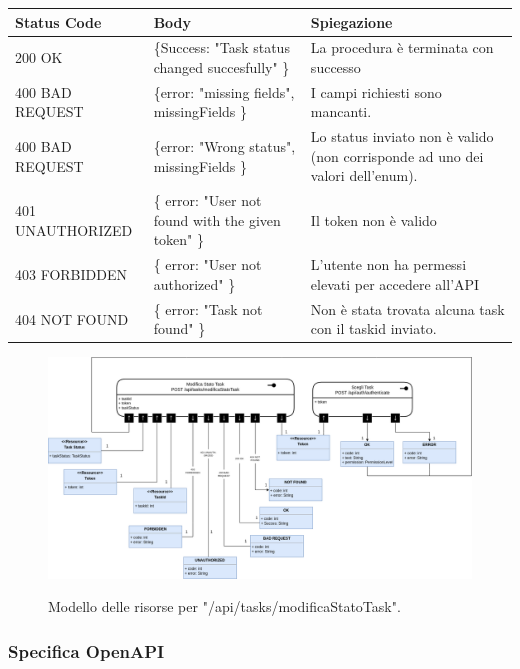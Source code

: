 \documentclass{report}
\begin{document}
\begin{center} %
	\centering
	\begin{tabular}{ |p{4cm}|p{4cm}|p{4cm}| }
		\hline
		\centering Status Code & \qquad\qquad\quad Body & \qquad\quad Spiegazione\\ %
		\hline
		200 OK & \{Success: "Task status changed succesfully" \}  & La procedura è terminata con successo	\\ 
		\hline
		400 BAD REQUEST & \{error: "missing fields", missingFields \} & I campi richiesti sono mancanti. \\
		\hline
		400 BAD REQUEST & \{error: "Wrong status", missingFields \} & Lo status inviato non è valido (non corrisponde ad uno dei valori dell'enum). \\
		\hline
		401 UNAUTHORIZED & \{ error: "User not found with the given token" \} & Il token non è valido \\
		\hline
		403 FORBIDDEN & \{ error: "User not authorized" \} &  L'utente non ha permessi elevati per accedere all'API \\
		\hline
		404 NOT FOUND & \{ error: "Task not found" \} & Non è stata trovata alcuna task con il taskid inviato. \\
		\hline
	\end{tabular}
\end{center}

\begin{figure}[H]
	\centering\includegraphics[width=1\textwidth]{images/model_modifica_task.png}
	
	Modello delle risorse per "/api/tasks/modificaStatoTask".
\end{figure}

\subsubsection*{Specifica OpenAPI}
\end{document}
